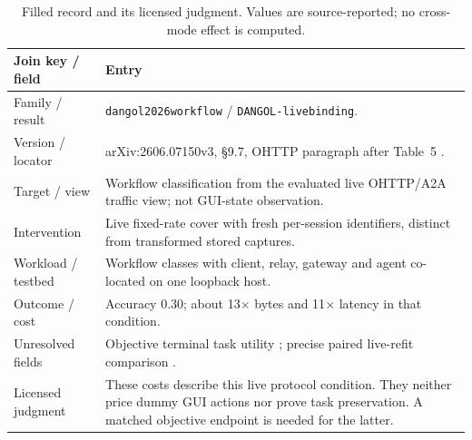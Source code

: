 \begin{table}[t]\centering\footnotesize
\caption{Filled record and its licensed judgment. Values are source-reported; no cross-mode effect is computed.}\label{tab:result-lineage}
\begin{tabularx}{\columnwidth}{@{}p{}Y@{}}\toprule
Join key / field & Entry\\\midrule
Family / result & \texttt{dangol2026workflow} / \texttt{DANGOL-livebinding}.\\
Version / locator & arXiv:2606.07150v3, \S9.7, OHTTP paragraph after Table~5 \cite{dangol2026workflow}.\\
Target / view & Workflow classification from the evaluated live OHTTP/A2A traffic view; not GUI-state observation.\\
Intervention & Live fixed-rate cover with fresh per-session identifiers, distinct from transformed stored captures.\\
Workload / testbed & Workflow classes with client, relay, gateway and agent co-located on one loopback host.\\
Outcome / cost & Accuracy 0.30; about 13$\times$ bytes and 11$\times$ latency in that condition.\\
Unresolved fields & Objective terminal task utility \NRR{}; precise paired live-refit comparison \NRV{}.\\
Licensed judgment & These costs describe this live protocol condition. They neither price dummy GUI actions nor prove task preservation. A matched objective endpoint is needed for the latter.\\\bottomrule
\end{tabularx}\end{table}
